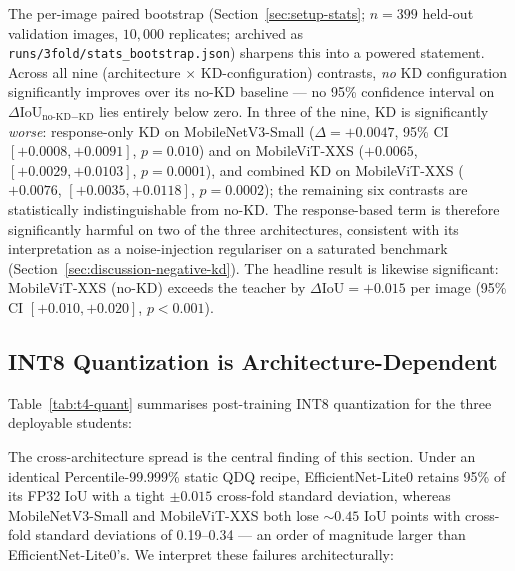 The per-image paired bootstrap (Section~\ref{sec:setup-stats}; $n=399$ held-out validation images, $10{,}000$ replicates; archived as \texttt{runs/3fold/stats\_bootstrap.json}) sharpens this into a powered statement. Across all nine (architecture $\times$ KD-configuration) contrasts, \emph{no} KD configuration significantly improves over its no-KD baseline --- no 95\% confidence interval on $\Delta\mathrm{IoU}_{\text{no-KD}-\text{KD}}$ lies entirely below zero. In three of the nine, KD is significantly \emph{worse}: response-only KD on MobileNetV3-Small ($\Delta = +0.0047$, 95\% CI $[+0.0008,+0.0091]$, $p=0.010$) and on MobileViT-XXS ($+0.0065$, $[+0.0029,+0.0103]$, $p=0.0001$), and combined KD on MobileViT-XXS ($+0.0076$, $[+0.0035,+0.0118]$, $p=0.0002$); the remaining six contrasts are statistically indistinguishable from no-KD. The response-based term is therefore significantly harmful on two of the three architectures, consistent with its interpretation as a noise-injection regulariser on a saturated benchmark (Section~\ref{sec:discussion-negative-kd}). The headline result is likewise significant: MobileViT-XXS (no-KD) exceeds the teacher by $\Delta\mathrm{IoU} = +0.015$ per image (95\% CI $[+0.010,+0.020]$, $p < 0.001$).

\subsection{INT8 Quantization is Architecture-Dependent}
\label{sec:results-quant}

Table~\ref{tab:t4-quant} summarises post-training INT8 quantization for the three deployable students:



The cross-architecture spread is the central finding of this section. Under an identical Percentile-99.999\% static QDQ recipe, EfficientNet-Lite0 retains 95\% of its FP32 IoU with a tight $\pm 0.015$ cross-fold standard deviation, whereas MobileNetV3-Small and MobileViT-XXS both lose $\sim 0.45$ IoU points with cross-fold standard deviations of 0.19--0.34 --- an order of magnitude larger than EfficientNet-Lite0's. We interpret these failures architecturally:

